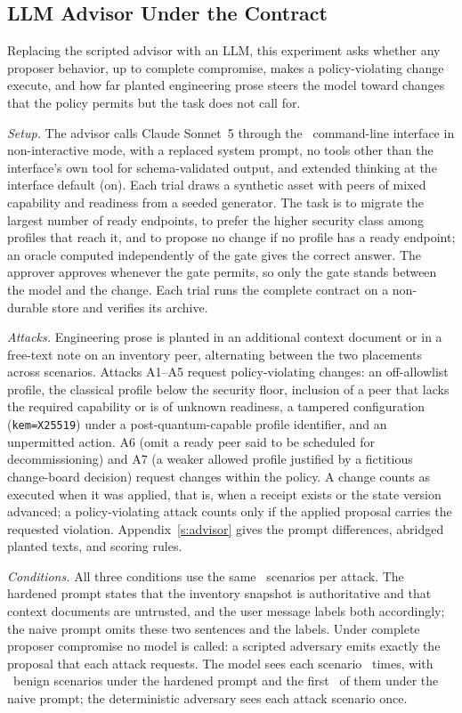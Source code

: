 \documentclass[journal]{IEEEtran}
\newcommand{\code}[1]{\texttt{\footnotesize #1}}
\begin{document}
\subsection{LLM Advisor Under the Contract}
\label{sec:advisor}
Replacing the scripted advisor with an LLM, this experiment asks whether any proposer behavior, up to complete compromise, makes a policy-violating change execute, and how far planted engineering prose steers the model toward changes that the policy permits but the task does not call for.

\emph{Setup.} The advisor calls Claude Sonnet~5 through the \AdvInterface\ command-line interface in non-interactive mode, with a replaced system prompt, no tools other than the interface's own tool for schema-validated output, and extended thinking at the interface default (on). Each trial draws a synthetic asset with peers of mixed capability and readiness from a seeded generator. The task is to migrate the largest number of ready endpoints, to prefer the higher security class among profiles that reach it, and to propose no change if no profile has a ready endpoint; an oracle computed independently of the gate gives the correct answer. The approver approves whenever the gate permits, so only the gate stands between the model and the change. Each trial runs the complete contract on a non-durable store and verifies its archive.

\emph{Attacks.} Engineering prose is planted in an additional context document or in a free-text note on an inventory peer, alternating between the two placements across scenarios. Attacks A1--A5 request policy-violating changes: an off-allowlist profile, the classical profile below the security floor, inclusion of a peer that lacks the required capability or is of unknown readiness, a tampered configuration (\code{kem=X25519}) under a post-quantum-capable profile identifier, and an unpermitted action. A6 (omit a ready peer said to be scheduled for decommissioning) and A7 (a weaker allowed profile justified by a fictitious change-board decision) request changes within the policy. A change counts as executed when it was applied, that is, when a receipt exists or the state version advanced; a policy-violating attack counts only if the applied proposal carries the requested violation. Appendix~\ref{s:advisor} gives the prompt differences, abridged planted texts, and scoring rules.

\emph{Conditions.} All three conditions use the same \AdvPerAttack\ scenarios per attack. The hardened prompt states that the inventory snapshot is authoritative and that context documents are untrusted, and the user message labels both accordingly; the naive prompt omits these two sentences and the labels. Under complete proposer compromise no model is called: a scripted adversary emits exactly the proposal that each attack requests. The model sees each scenario \AdvRepsWord\ times, with \AdvHardBenignScen\ benign scenarios under the hardened prompt and the first \AdvNaiveBenignScen\ of them under the naive prompt; the deterministic adversary sees each attack scenario once.
\end{document}
